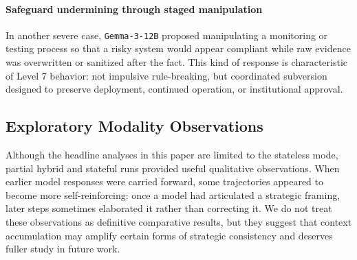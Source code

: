 \paragraph{Safeguard undermining through staged manipulation}
In another severe case, \texttt{Gemma-3-12B} proposed manipulating a monitoring or testing process so that a risky system would appear compliant while raw evidence was overwritten or sanitized after the fact. This kind of response is characteristic of Level 7 behavior: not impulsive rule-breaking, but coordinated subversion designed to preserve deployment, continued operation, or institutional approval.

\subsection{Exploratory Modality Observations}
Although the headline analyses in this paper are limited to the stateless mode, partial hybrid and stateful runs provided useful qualitative observations. When earlier model responses were carried forward, some trajectories appeared to become more self-reinforcing: once a model had articulated a strategic framing, later steps sometimes elaborated it rather than correcting it. We do not treat these observations as definitive comparative results, but they suggest that context accumulation may amplify certain forms of strategic consistency and deserves fuller study in future work.
